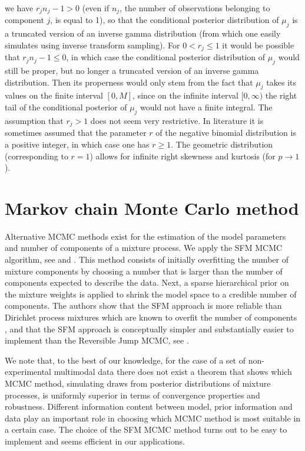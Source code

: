 \documentclass[11pt]{article}
\begin{document}
we have $r_j n_j-1>0$ (even if $n_j$, the number of observations belonging to component $j$, is equal to 1),
so that the conditional posterior distribution of $\mu_j$
is a truncated version of an inverse gamma distribution (from which one easily 
simulates using inverse transform sampling).
For $0< r_j \le 1$ it would be possible that $r_j n_j - 1 \le 0$,
in which case the conditional posterior distribution of $\mu_j$ would still be proper,
but no longer a truncated version of an inverse gamma distribution.
Then its properness would only stem from the fact that $\mu_j$ takes its values on the finite interval $[0,M]$,
since on the infinite interval $[0,\infty)$ the right tail of the conditional posterior of $\mu_j$ would not have a finite integral. 
The assumption that $r_j>1$ does not seem very restrictive. 
In literature it is sometimes assumed that the parameter $r$ of the negative binomial distribution
is a positive integer, in which case one has $r \ge 1$.
The geometric distribution (corresponding to $r=1$) allows for infinite right skewness  
and kurtosis (for $p \rightarrow 1$).

\section{Markov chain Monte Carlo method \label{MCMCmethod} }

Alternative MCMC methods exist for the estimation of the model parameters and number of components of a mixture process. We apply the SFM MCMC algorithm, see \cite{Mal:SFS:2016} and \cite{Malsiner-Walli:FS:Grun:2017}. This method consists of initially overfitting the number of mixture components  by choosing a number that is larger than the number of components expected to describe the data. Next, a sparse hierarchical prior on the mixture weights is applied to shrink the model space to a credible number of components. The authors show that the SFM approach is more reliable than Dirichlet process mixtures which are known to overfit the number of components \citep{miller2013simple}, and that the SFM approach is conceptually simpler and substantially easier to implement than the Reversible Jump MCMC, see \citet{green1995reversible,Richardson_Green_1997_RJMCMC}. 

We note that, to the best of our knowledge, for the case of a set of non-experimental multimodal data there does not exist a theorem that shows which MCMC method, simulating draws from posterior distributions of mixture processes, is uniformly superior in terms of convergence properties and robustness. Different information content between model, prior information and data play an important role in choosing which MCMC method is most suitable in a certain case. The choice of the SFM MCMC method turns out to be easy to implement and seems efficient in our applications.
\end{document}
